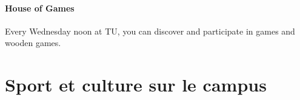 \paragraph{House of Games} Every Wednesday noon at TU, you can discover and participate in games and wooden games.

\section{Sport et culture sur le campus}\trad
%
%
